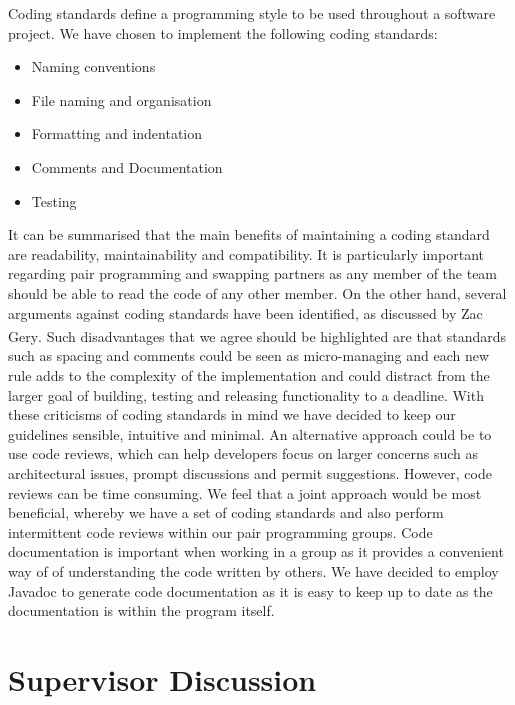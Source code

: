 \documentclass[10pt, a4paper]{article}
\begin{document}
Coding standards define a programming style to be used throughout a software project. We have chosen to implement the following coding standards:
\begin{itemize}

  \item Naming conventions
  \item File naming and organisation
  \item Formatting and indentation
  \item Comments and Documentation
  \item Testing

\end{itemize}
It can be summarised that the main benefits of maintaining a coding standard are readability, maintainability and compatibility. It is particularly important regarding pair programming and swapping partners as any member of the team should be able to read the code of any other member. On the other hand, several arguments against coding standards have been identified, as discussed by Zac Gery\textsuperscript{\cite{zac}}. Such disadvantages that we agree should be highlighted are that standards such as spacing and comments could be seen as micro-managing and each new rule adds to the complexity of the implementation and could distract from the larger goal of building, testing and releasing functionality to a deadline. With these criticisms of coding standards in mind we have decided to keep our guidelines sensible, intuitive and minimal. An alternative approach could be to use code reviews, which can help developers focus on larger concerns such as architectural issues, prompt discussions and permit suggestions. However, code reviews can be time consuming. We feel that a joint approach would be most beneficial, whereby we have a set of coding standards and also perform intermittent code reviews within our pair programming groups. Code documentation is important when working in a group as it provides a convenient way of of understanding the code written by others. We have decided to employ Javadoc to generate code documentation as it is easy to keep up to date as the documentation is within the program itself.

\section{Supervisor Discussion}
\end{document}
